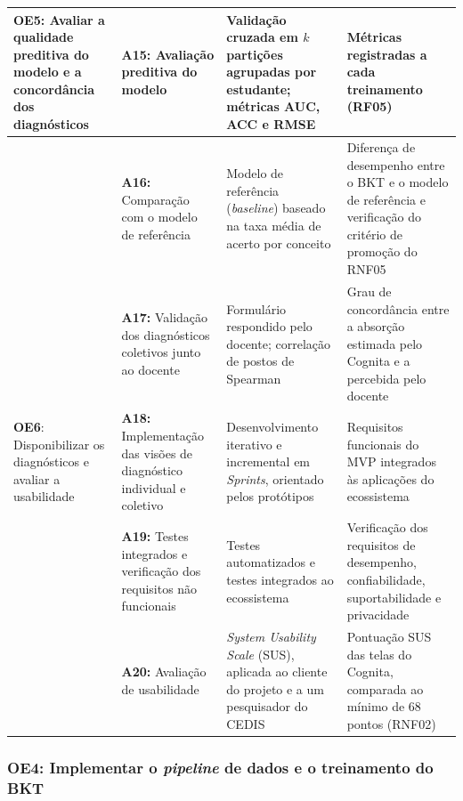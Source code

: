 {\begin{longtable}{>{\raggedright\arraybackslash}p{2.3cm}>{\raggedright\arraybackslash}p{3.7cm}>{\raggedright\arraybackslash}p{3.8cm}>{\raggedright\arraybackslash}p{4.2cm}}
\hline
\textbf{OE5}: Avaliar a qualidade preditiva do modelo e a concordância dos diagnósticos
& \textbf{A15:} Avaliação preditiva do modelo
& Validação cruzada em $k$ partições agrupadas por estudante; métricas AUC, ACC e RMSE
& Métricas registradas a cada treinamento (RF05) \\
\cline{2-4}
& \textbf{A16:} Comparação com o modelo de referência
& Modelo de referência (\textit{baseline}) baseado na taxa média de acerto por conceito
& Diferença de desempenho entre o BKT e o modelo de referência e verificação do critério de promoção do RNF05 \\
\cline{2-4}
& \textbf{A17:} Validação dos diagnósticos coletivos junto ao docente
& Formulário respondido pelo docente; correlação de postos de Spearman
& Grau de concordância entre a absorção estimada pelo Cognita e a percebida pelo docente \\
\hline
\textbf{OE6}: Disponibilizar os diagnósticos e avaliar a usabilidade
& \textbf{A18:} Implementação das visões de diagnóstico individual e coletivo
& Desenvolvimento iterativo e incremental em \textit{Sprints}, orientado pelos protótipos
& Requisitos funcionais do MVP integrados às aplicações do ecossistema \\
\cline{2-4}
& \textbf{A19:} Testes integrados e verificação dos requisitos não funcionais
& Testes automatizados e testes integrados ao ecossistema
& Verificação dos requisitos de desempenho, confiabilidade, suportabilidade e privacidade \\
\cline{2-4}
& \textbf{A20:} Avaliação de usabilidade
& \textit{System Usability Scale} (SUS), aplicada ao cliente do projeto e a um pesquisador do CEDIS
& Pontuação SUS das telas do Cognita, comparada ao mínimo de 68 pontos (RNF02) \\
\end{longtable}
}

\subsubsection{OE4: Implementar o \textit{pipeline} de dados e o treinamento do BKT}
\label{subsubsec:oe4}

